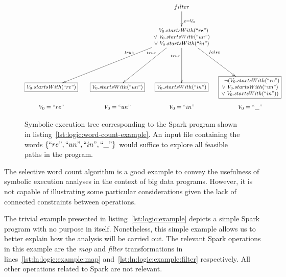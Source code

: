 \begin{figure}[t]
	\[\xymatrix@C=0.3em @R=0.8em{ 
		& & & & & \ar[dd]^<(0.4){x = V_{0}} filter & & \\
		& & & & & & & \\
		& & & & & \ar@{}[llllldddd]_<(0.2){true} \ar[llllldddd]
		\ar@{}[lldddd]_<(0.2){true} \ar[lldddd]
		\ar@{}[dddd]_<(0.2){true} \ar[dddd]
		\txt{\small $~~V_{0}.startsWith(``re")$ \\ 
			\small $\lor ~V_{0}.startsWith(``un")$ \\
			\small $\lor ~V_{0}.startsWith(``in")$} 
		\ar[rrdddd] \ar@{}[rrdddd]^<(0.2){false} & & \\
		& & & & & & & \\
		& & & & & & & \\
		& & & & & & & \\
		*+[F] \txt{\small $V_{0}.startsWith(``re")$} & & &
		*+[F] \txt{\small $V_{0}.startsWith(``un")$} & & 
		*+[F] \txt{\small $V_{0}.startsWith(``in")$} & &
		*+[F] \txt{\small $~~\lnot(V_{0}.startsWith(``re")$ \\ 
			\small $\lor ~V_{0}.startsWith(``un")$ \\
			\small $\lor ~V_{0}.startsWith(``in"))$} \\
		V_{0} = ``re" & & & V_{0} = ``un" & &  V_{0} = ``in" & & V_{0} = ``\_" \\
	} \]
	\caption[Symbolic Execution Tree of the Selective Word Count Example]{Symbolic execution tree corresponding to the Spark program shown in listing~\ref{lst:logic:word-count-example}. An input file containing the words $\{``re",``un",``in",``\_"\}$ would suffice to explore all feasible paths in the program.}
	\label{fig:logic:symbolic-spark-word-count-example}
\end{figure}


The selective word count algorithm is a good example to convey the usefulness of symbolic execution analyses in the context of big data programs. However, it is not capable of illustrating some particular considerations given the lack of connected constraints between operations. 

The trivial example presented in listing~\ref{lst:logic:example} depicts a simple Spark program with no purpose in itself. Nonetheless, this simple example allows us to better explain how the analysis will be carried out. The relevant Spark operations in this example are the \textit{map} and \textit{filter} transformations in lines~\ref{lst:ln:logic:example:map} and~\ref{lst:ln:logic:example:filter} respectively. All other operations related to Spark are not relevant.


